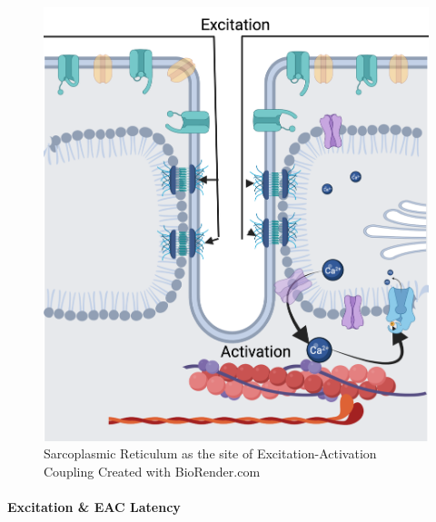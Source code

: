 \begin{figure}[!ht]
    \centering
    \includegraphics[width=1\linewidth]{./figure/SR.png}
    \caption{Sarcoplasmic Reticulum as the site of Excitation-Activation Coupling \footnotesize{Created with BioRender.com}}
    \label{fig:SR}
\end{figure}

\paragraph{Excitation \& EAC Latency}

